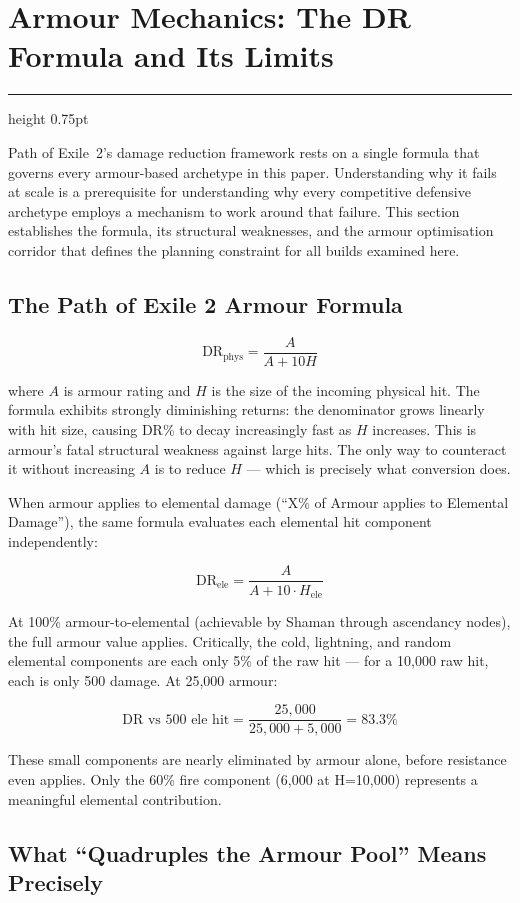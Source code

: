 \documentclass[12pt, letterpaper]{article}
\newcommand{\newsection}[1]{%
    \newpage
    \section{#1}
    \hrule height 0.75pt
    \vspace{4pt}
}
\begin{document}
\newpage


\newsection{Armour Mechanics: The DR Formula and Its Limits}

Path of Exile~2's damage reduction framework rests on a single formula that governs every armour-based archetype in this paper. Understanding why it fails at scale is a prerequisite for understanding why every competitive defensive archetype employs a mechanism to work around that failure. This section establishes the formula, its structural weaknesses, and the armour optimisation corridor that defines the planning constraint for all builds examined here.

\subsection*{The Path of Exile 2 Armour Formula}

\[
\text{DR}_{\text{phys}} = \frac{A}{A + 10H}
\]

where $A$ is armour rating and $H$ is the size of the incoming physical hit. The formula exhibits strongly diminishing returns: the denominator grows linearly with hit size, causing DR\% to decay increasingly fast as $H$ increases. This is armour's fatal structural weakness against large hits. The only way to counteract it without increasing $A$ is to reduce $H$ --- which is precisely what conversion does.

When armour applies to elemental damage (``X\% of Armour applies to Elemental Damage''), the same formula evaluates each elemental hit component independently:

\[
\text{DR}_{\text{ele}} = \frac{A}{A + 10 \cdot H_{\text{ele}}}
\]

At 100\% armour-to-elemental (achievable by Shaman through ascendancy nodes), the full armour value applies. Critically, the cold, lightning, and random elemental components are each only 5\% of the raw hit --- for a 10{,}000 raw hit, each is only 500 damage. At 25{,}000 armour:

\[
\text{DR vs 500 ele hit} = \frac{25{,}000}{25{,}000 + 5{,}000} = 83.3\%
\]

These small components are nearly eliminated by armour alone, before resistance even applies. Only the 60\% fire component (6{,}000 at H=10{,}000) represents a meaningful elemental contribution.

\subsection*{What ``Quadruples the Armour Pool'' Means Precisely}
\end{document}
